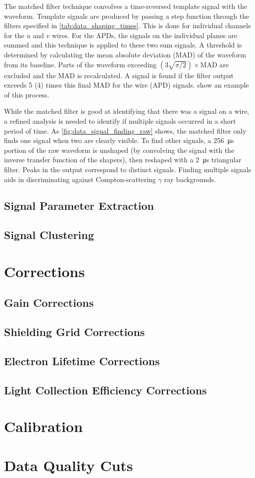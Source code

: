 \documentclass[herrin-thesis.tex]{subfiles}
\begin{document}
The matched filter technique\cite{North:1963fk} convolves a time-reversed template signal with the waveform. Template signals are produced by passing a step function through the filters specified in \cref{tab:data_shaping_times}. This is done for individual channels for the \(u\) and \(v\) wires. For the APDs, the signals on the individual planes are summed and this technique is applied to these two sum signals. A threshold is determined by calculating the mean absolute deviation (MAD) of the waveform from its baseline. Parts of the waveform exceeding \((3\sqrt{\pi/2})\times\text{MAD}\) are excluded and the MAD is recalculated. A signal is found if the filter output exceeds 5 (4) times this final MAD for the wire (APD) signals.  show an example of this process.

While the matched filter is good at identifying that there was a signal on a wire, a refined analysis is needed to identify if multiple signals occurred in a short period of time. As \cref{fig:data_signal_finding_raw} shows, the matched filter only finds one signal when two are clearly visible. To find other signals, a \SI{256}{\micro\s} portion of the raw waveform is unshaped (by convolving the signal with the inverse transfer function of the shapers), then reshaped with a \SI{2}{\micro\s} triangular filter. Peaks in the output correspond to distinct signals. Finding multiple signals aids in discriminating against Compton-scattering \(\gamma\) ray backgrounds.

\subsection{Signal Parameter Extraction}

\subsection{Signal Clustering}

\section{Corrections}
\subsection{Gain Corrections}
\subsection{Shielding Grid Corrections}
\subsection{Electron Lifetime Corrections}
\subsection{Light Collection Efficiency Corrections}

\section{Calibration}

\section{Data Quality Cuts}
\end{document}
